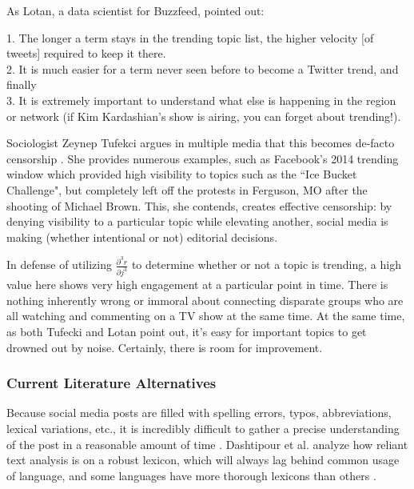 \documentclass[preprint,review,12pt]{elsarticle}
\begin{document}
As Lotan, a data scientist for Buzzfeed, pointed out:
\begin{displayquote}
1. The longer a term stays in the trending topic list, the higher velocity [of tweets] required to keep it there. \\
2. It is much easier for a term never seen before to become a Twitter trend, and finally \\
3. It is extremely important to understand what else is happening in the region or network (if Kim Kardashian’s show is airing, you can forget about trending!). \cite{lotan2015freddie}
\end{displayquote}

Sociologist Zeynep Tufekci argues in multiple media that this becomes de-facto censorship \cite{tufekci2017twitter,tufecki2018democracy,tufekci2017we,tufekci2014online}. She provides numerous examples, such as Facebook's 2014 trending window which provided high visibility to topics such as the ``Ice Bucket Challenge", but completely left off the protests in Ferguson, MO after the shooting of Michael Brown. This, she contends, creates effective censorship: by denying visibility to a particular topic while elevating another, social media is making (whether intentional or not) editorial decisions. 

In defense of utilizing $\frac{\partial^3 r}{\partial j^3}$ to determine whether or not a topic is trending, a high value here shows very high engagement at a particular point in time. There is nothing inherently wrong or immoral about connecting disparate groups who are all watching and commenting on a TV show at the same time. At the same time, as both Tufecki and Lotan point out, it's easy for important topics to get drowned out by noise. Certainly, there is room for improvement.

\subsubsection{Current Literature Alternatives} 
Because social media posts are filled with spelling errors, typos, abbreviations, lexical variations, etc., it is incredibly difficult to gather a precise understanding of the post in a reasonable amount of time \cite{vandam2019learning,laniado2010making,schubert2014signitrend}. Dashtipour et al. analyze how reliant text analysis is on a robust lexicon, which will always lag behind common usage of language, and some languages have more thorough lexicons than others \cite{dashtipour2016multilingual}.
\end{document}
